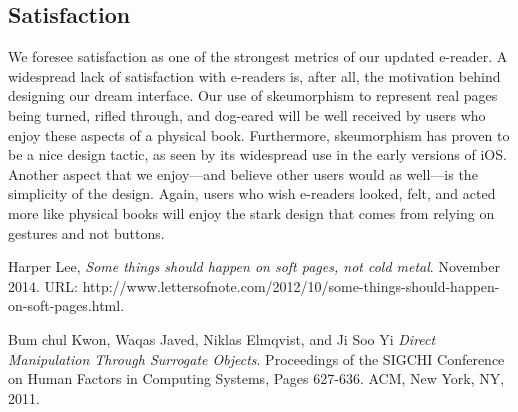 \documentclass[11pt, oneside]{article}   	%
\begin{document}
\subsection {Satisfaction}
We foresee satisfaction as one of the strongest metrics of our updated e-reader. A widespread lack of satisfaction with e-readers is, after all, the motivation behind designing our dream interface. Our use of skeumorphism to represent real pages being turned, rifled through, and dog-eared will be well received by users who enjoy these aspects of a physical book. Furthermore, skeumorphism has proven to be a nice design tactic, as seen by its widespread use in the early versions of iOS. Another aspect that we enjoy---and believe other users would as well---is the simplicity of the design. Again, users who wish e-readers looked, felt, and acted more like physical books will enjoy the stark design that comes from relying on gestures and not buttons.

\begin{thebibliography}{9}

  Harper Lee,
  \emph{Some things should happen on soft pages, not cold metal}.
  November 2014.
  URL: http://www.lettersofnote.com/2012/10/some-things-should-happen-on-soft-pages.html.
  
  Bum chul Kwon, Waqas Javed, Niklas Elmqvist, and Ji Soo Yi
  \emph{Direct Manipulation Through Surrogate Objects}.
  Proceedings of the SIGCHI Conference on Human Factors in Computing Systems,
  Pages 627-636.
  ACM, New York, NY,
  2011.

\end{thebibliography}
\end{document}
